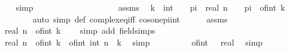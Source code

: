 \begin{isabellebody}
\ \ \isamarkupfalse%
\ {\isacharbrackleft}{\kern0pt}simp{\isacharbrackright}{\kern0pt}{\isacharcolon}{\kern0pt}\ {\isachardoublequoteopen}{\isasymomega}\ {\isasymnoteq}\ {}{\isachardoublequoteclose}\isanewline
\ \ \isamarkupfalse%
\isanewline
\ \ \ \ \isamarkupfalse%
\ {\isachardoublequoteopen}{\isasymomega}\ {\isacharequal}{\kern0pt}\ {}{\isachardoublequoteclose}\isanewline
\ \ \ \ \isamarkupfalse%
\ assms\ \isamarkupfalse%
\ k\ {\isacharcolon}{\kern0pt}{\isacharcolon}{\kern0pt}\ int\ \ {\isachardoublequoteopen}{}\ {\isacharasterisk}{\kern0pt}\ pi\ {\isacharslash}{\kern0pt}\ real\ n\ {\isacharequal}{\kern0pt}\ {}\ {\isacharasterisk}{\kern0pt}\ pi\ {\isacharasterisk}{\kern0pt}\ of{\isacharunderscore}{\kern0pt}int\ k{\isachardoublequoteclose}\isanewline
\ \ \ \ \ \ \isamarkupfalse%
\ {\isacharparenleft}{\kern0pt}auto\ simp{\isacharcolon}{\kern0pt}\ {\isasymomega}{\isacharunderscore}{\kern0pt}def\ complex{\isacharunderscore}{\kern0pt}eq{\isacharunderscore}{\kern0pt}iff\ cos{\isacharunderscore}{\kern0pt}one{\isacharunderscore}{\kern0pt}{}pi{\isacharunderscore}{\kern0pt}int{\isacharparenright}{\kern0pt}\isanewline
\ \ \ \ \isamarkupfalse%
\ assms\ \isamarkupfalse%
\ {\isachardoublequoteopen}real\ n\ {\isacharasterisk}{\kern0pt}\ of{\isacharunderscore}{\kern0pt}int\ k\ {\isacharequal}{\kern0pt}\ {}{\isachardoublequoteclose}\ \isamarkupfalse%
\ {\isacharparenleft}{\kern0pt}simp\ add{\isacharcolon}{\kern0pt}\ field{\isacharunderscore}{\kern0pt}simps{\isacharparenright}{\kern0pt}\isanewline
\ \ \ \ \isamarkupfalse%
\ \isamarkupfalse%
\ {\isachardoublequoteopen}real\ n\ {\isacharasterisk}{\kern0pt}\ of{\isacharunderscore}{\kern0pt}int\ k\ {\isacharequal}{\kern0pt}\ of{\isacharunderscore}{\kern0pt}int\ {\isacharparenleft}{\kern0pt}int\ n\ {\isacharasterisk}{\kern0pt}\ k{\isacharparenright}{\kern0pt}{\isachardoublequoteclose}\ \isamarkupfalse%
\ simp\isanewline
\ \ \ \ \isamarkupfalse%
\ \isamarkupfalse%
\ {\isachardoublequoteopen}{}\ {\isacharequal}{\kern0pt}\ {\isacharparenleft}{\kern0pt}of{\isacharunderscore}{\kern0pt}int\ {}\ {\isacharcolon}{\kern0pt}{\isacharcolon}{\kern0pt}\ real{\isacharparenright}{\kern0pt}{\isachardoublequoteclose}\ \isamarkupfalse%
\ simp\isanewline
\ \ \ \ \isamarkupfalse%

\end{isabellebody}

